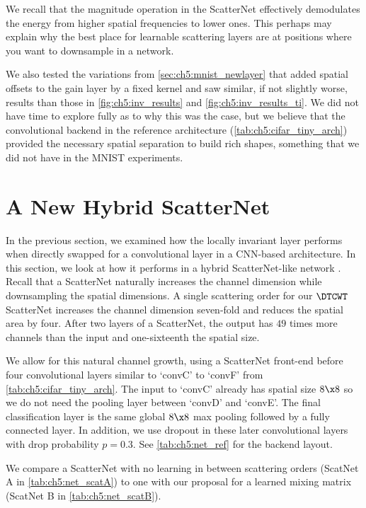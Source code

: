 We recall that the magnitude operation in the ScatterNet effectively
demodulates the energy from higher spatial frequencies to lower ones. This
perhaps may explain why the best place for learnable scattering layers
are at positions where you want to downsample in a network.

We also tested the variations from \autoref{sec:ch5:mnist_newlayer} that added
spatial offsets to the gain layer by a fixed kernel and saw similar, if not
slightly worse, results than those in \autoref{fig:ch5:inv_results} and
\autoref{fig:ch5:inv_results_ti}. We did not
have time to explore fully as to why this was the case, but we believe that the
convolutional backend in the reference architecture (\autoref{tab:ch5:cifar_tiny_arch})
provided the necessary spatial separation to build rich shapes, something that
we did not have in the MNIST experiments.

\section{A New Hybrid ScatterNet}\label{sec:ch5:scat_exp}


In the previous section, we examined how the locally invariant layer performs when
directly swapped for a convolutional layer in a CNN-based architecture.
In this section, we look at how it performs in a hybrid ScatterNet-like network
\cite{oyallon_scaling_2017}. Recall that a ScatterNet
naturally increases the channel dimension while downsampling the spatial
dimensions. A single scattering order for our $\DTCWT$ ScatterNet increases the channel dimension 
seven-fold and reduces the spatial area by four. After two layers of a
ScatterNet, the output has $49$ times more channels than the input and
one-sixteenth the spatial size.

We allow for this natural channel growth, using a ScatterNet front-end before
four convolutional layers similar to `convC' to `convF' from
\autoref{tab:ch5:cifar_tiny_arch}. The input to `convC' already has spatial size
$8\x 8$ so we do not need the pooling layer between `convD' and `convE'. The
final classification layer is the same global $8\x 8$ max pooling followed by a
fully connected layer. In addition, we use dropout in these later convolutional
layers with drop probability $p=0.3$. See \autoref{tab:ch5:net_ref} for the
backend layout. 

We compare a ScatterNet with no learning in between scattering orders (ScatNet A
in \autoref{tab:ch5:net_scatA}) to one with our proposal for a learned mixing
matrix (ScatNet B in \autoref{tab:ch5:net_scatB}). 

